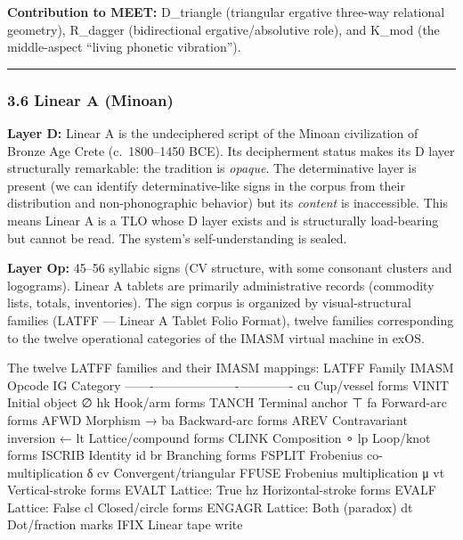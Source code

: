 \documentclass[
  11pt,
  a4paper,
]{article}
\begin{document}
\textbf{Contribution to MEET:} D\_triangle (triangular ergative
three-way relational geometry), R\_dagger (bidirectional
ergative/absolutive role), and K\_mod (the middle-aspect ``living
phonetic vibration'').

\begin{center}\rule{0.5\linewidth}{0.5pt}\end{center}

\subsubsection{3.6 Linear A (Minoan)}\label{linear-a-minoan}

\textbf{Layer D:} Linear A is the undeciphered script of the Minoan
civilization of Bronze Age Crete (c.~1800--1450 BCE). Its decipherment
status makes its D layer structurally remarkable: the tradition is
\emph{opaque}. The determinative layer is present (we can identify
determinative-like signs in the corpus from their distribution and
non-phonographic behavior) but its \emph{content} is inaccessible. This
means Linear A is a TLO whose D layer exists and is structurally
load-bearing but cannot be read. The system's self-understanding is
sealed.

\textbf{Layer Op:} 45--56 syllabic signs (CV structure, with some
consonant clusters and logograms). Linear A tablets are primarily
administrative records (commodity lists, totals, inventories). The sign
corpus is organized by visual-structural families (LATFF --- Linear A
Tablet Folio Format), twelve families corresponding to the twelve
operational categories of the IMASM virtual machine in exOS.

The twelve LATFF families and their IMASM mappings: \textbar{} LATFF
\textbar{} Family \textbar{} IMASM Opcode \textbar{} IG Category
\textbar{}
\textbar-------\textbar--------\textbar-------------\textbar-------------\textbar{}
\textbar{} cu \textbar{} Cup/vessel forms \textbar{} VINIT \textbar{}
Initial object ∅ \textbar{} \textbar{} hk \textbar{} Hook/arm forms
\textbar{} TANCH \textbar{} Terminal anchor ⊤ \textbar{} \textbar{} fa
\textbar{} Forward-arc forms \textbar{} AFWD \textbar{} Morphism →
\textbar{} \textbar{} ba \textbar{} Backward-arc forms \textbar{} AREV
\textbar{} Contravariant inversion ← \textbar{} \textbar{} lt \textbar{}
Lattice/compound forms \textbar{} CLINK \textbar{} Composition ∘
\textbar{} \textbar{} lp \textbar{} Loop/knot forms \textbar{} ISCRIB
\textbar{} Identity id \textbar{} \textbar{} br \textbar{} Branching
forms \textbar{} FSPLIT \textbar{} Frobenius co-multiplication δ
\textbar{} \textbar{} cv \textbar{} Convergent/triangular \textbar{}
FFUSE \textbar{} Frobenius multiplication μ \textbar{} \textbar{} vt
\textbar{} Vertical-stroke forms \textbar{} EVALT \textbar{} Lattice:
True \textbar{} \textbar{} hz \textbar{} Horizontal-stroke forms
\textbar{} EVALF \textbar{} Lattice: False \textbar{} \textbar{} cl
\textbar{} Closed/circle forms \textbar{} ENGAGR \textbar{} Lattice:
Both (paradox) \textbar{} \textbar{} dt \textbar{} Dot/fraction marks
\textbar{} IFIX \textbar{} Linear tape write \textbar{}
\end{document}
